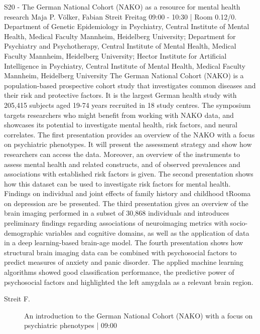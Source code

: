 
            \begin{symposium}
            {S20 - The German National Cohort (NAKO) as a resource for mental health research}
            {Maja P. Völker, Fabian Streit}
            {Freitag 09:00 - 10:30 | Room 0.12/0.}
            {Department of Genetic Epidemiology in Psychiatry, Central Institute of Mental Health, Medical Faculty Mannheim, Heidelberg University; Department for Psychiatry and Psychotherapy, Central Institute of Mental Health, Medical Faculty Mannheim, Heidelberg University; Hector Institute for Artificial Intelligence in Psychiatry, Central Institute of Mental Health, Medical Faculty Mannheim, Heidelberg University}
            The German National Cohort (NAKO) is a population-based prospective cohort study that investigates common diseases and their risk and protective factors. It is the largest German health study with 205,415 subjects aged 19-74 years recruited in 18 study centres. The symposium targets researchers who might benefit from working with NAKO data, and showcases its potential to investigate mental health, risk factors, and neural correlates. The first presentation provides an overview of the NAKO with a focus on psychiatric phenotypes. It will present the assessment strategy and show how researchers can access the data. Moreover, an overview of the instruments to assess mental health and related constructs, and of observed prevalences and associations with established risk factors is given. The second presentation shows how this dataset can be used to investigate risk factors for mental health. Findings on individual and joint effects of family history and childhood tRooma on depression are be presented. The third presentation gives an overview of the brain imaging performed in a subset of 30,868 individuals and introduces preliminary findings regarding associations of neuroimaging metrics with socio-demographic variables and cognitive domains, as well as the application of data in a deep learning-based brain-age model. The fourth presentation shows how structural brain imaging data can be combined with psychosocial factors to predict measures of anxiety and panic disorder. The applied machine learning algorithms showed good classification performance, the predictive power of psychosocial factors and highlighted the left amygdala as a relevant brain region.
            \begin{description}    
            
                \item [ Streit F.] An introduction to the German National Cohort (NAKO) with a focus on psychiatric phenotypes \textcolor{mygray}{ | 09:00}    
                

\end{description}
\end{symposium}
